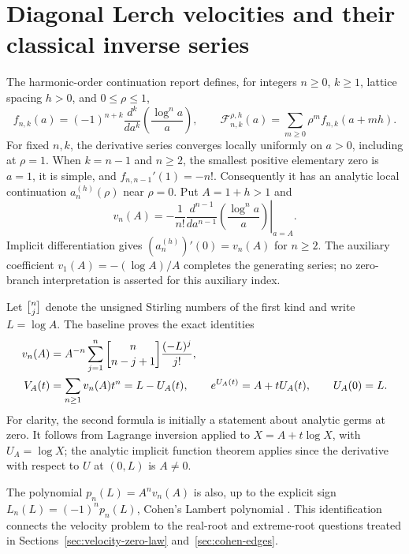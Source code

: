 \section{Diagonal Lerch velocities and their classical inverse series}
\label{sec:diagonal-inverse}

The harmonic-order continuation report \cite{HarmonicBaseline} defines,
for integers $n\geq 0$, $k\geq 1$, lattice spacing $h>0$, and
$0\leq\rho\leq1$,
\[
 f_{n,k}(a)=(-1)^{n+k}\frac{d^k}{da^k}
                  \left(\frac{\log^n a}{a}\right),\qquad
 \mathscr F_{n,k}^{\rho,h}(a)
       =\sum_{m\geq0}\rho^m f_{n,k}(a+mh).
\]
For fixed $n,k$, the derivative series converges locally uniformly on
$a>0$, including at $\rho=1$.  When $k=n-1$ and $n\geq2$, the smallest
positive elementary zero is $a=1$, it is simple, and
$f_{n,n-1}'(1)=-n!$.  Consequently it has an analytic local continuation
$a_n^{(h)}(\rho)$ near $\rho=0$.  Put $A=1+h>1$ and
\begin{equation}\label{eq:velocity-normalization}
 v_n(A)=-\frac1{n!}
   \left.\frac{d^{n-1}}{da^{n-1}}
                  \left(\frac{\log^n a}{a}\right)\right|_{a=A}.
\end{equation}
Implicit differentiation gives
$(a_n^{(h)})'(0)=v_n(A)$ for $n\geq2$.  The auxiliary coefficient
$v_1(A)=-(\log A)/A$ completes the generating series; no zero-branch
interpretation is asserted for this auxiliary index.

Let $\stirling{n}{j}$ denote the unsigned Stirling numbers of
the first kind and write $L=\log A$.  The baseline proves the exact
identities
\begin{align}
 v_n(A)&=A^{-n}\sum_{j=1}^n
           \stirling{n}{n-j+1}\frac{(-L)^j}{j!},
                  \label{eq:velocity-stirling}\\
 V_A(t)&=\sum_{n\geq1}v_n(A)t^n=L-U_A(t),\qquad
 e^{U_A(t)}=A+tU_A(t),\qquad U_A(0)=L.
                  \label{eq:velocity-inverse}
\end{align}
For clarity, the second formula is initially a statement about analytic
germs at zero.  It follows from Lagrange inversion \cite{Gessel2016} applied to
$X=A+t\log X$, with $U_A=\log X$; the analytic implicit function theorem
applies since the derivative with respect to $U$ at $(0,L)$ is $A\neq0$.

The polynomial $p_n(L)=A^n v_n(A)$ is also, up to the explicit sign
$L_n(L)=(-1)^n p_n(L)$, Cohen's Lambert polynomial
\cite[Proposition~4.8]{Cohen2021}.  This identification connects the
velocity problem to the real-root and extreme-root questions treated
in Sections~\ref{sec:velocity-zero-law} and~\ref{sec:cohen-edges}.

